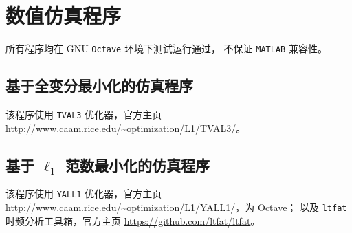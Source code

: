 \chapter{数值仿真程序}

所有程序均在 GNU \verb|Octave| 环境下测试运行通过，
不保证 \verb|MATLAB| 兼容性。

\section{基于全变分最小化的仿真程序}

该程序使用 \verb|TVAL3| 优化器，官方主页
\url{http://www.caam.rice.edu/~optimization/L1/TVAL3/}。

\lstset{basicstyle=\ttfamily}



\section{基于 $\ell_1$ 范数最小化的仿真程序}

该程序使用 \verb|YALL1| 优化器，官方主页
\url{http://www.caam.rice.edu/~optimization/L1/YALL1/}，为 Octave；
以及 \verb|ltfat| 时频分析工具箱，官方主页
\url{https://github.com/ltfat/ltfat}。




